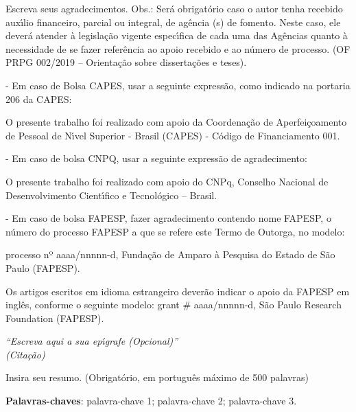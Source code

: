\documentclass[12pt,oneside,a4paper,english]{abntex2}
\begin{document}
\begin{agradecimentos}
    Escreva seus agradecimentos.
    Obs.: Ser\'{a} obrigat\'{o}rio caso o autor tenha recebido aux\'{\i}lio financeiro, parcial ou integral, de ag\^{e}ncia (s) de fomento. Neste caso, ele dever\'{a} atender \`{a} legisla\c{c}\~{a}o vigente espec\'{\i}fica de cada uma das Ag\^{e}ncias quanto \`{a} necessidade de se fazer refer\^{e}ncia ao apoio recebido e ao n\'{u}mero de processo. (OF PRPG 002/2019 – Orienta\c{c}\~{a}o sobre disserta\c{c}\~{o}es e teses).

    -	Em caso de Bolsa CAPES, usar a seguinte express\~{a}o, como indicado na portaria 206 da CAPES:

    O presente trabalho foi realizado com apoio da Coordena\c{c}\~{a}o de Aperfei\c{c}oamento de Pessoal de N\'{\i}vel Superior - Brasil (CAPES) - C\'{o}digo de Financiamento 001.

    -	Em caso de bolsa CNPQ, usar a seguinte express\~{a}o de agradecimento:

    O presente trabalho foi realizado com apoio do CNPq, Conselho Nacional de Desenvolvimento Cient\'{\i}fico  e Tecnol\'{o}gico – Brasil.

    -	Em caso de bolsa FAPESP, fazer agradecimento contendo nome FAPESP, o n\'{u}mero do processo FAPESP a que se refere este Termo de Outorga, no modelo:

    processo nº aaaa/nnnnn-d, Funda\c{c}\~{a}o de Amparo \`{a} Pesquisa do Estado de S\~{a}o Paulo (FAPESP).

    Os artigos escritos em idioma estrangeiro dever\~{a}o indicar o apoio da FAPESP em ingl\^{e}s, conforme o seguinte modelo: grant \# aaaa/nnnnn-d, S\~{a}o Paulo Research Foundation (FAPESP).
\end{agradecimentos}


\begin{epigrafe}
    \vspace*{\fill}
    \begin{flushright}
        \textit{``Escreva aqui a sua ep\'{\i}grafe (Opcional)''\\
        (Cita\c{c}\~{a}o)}
    \end{flushright}
\end{epigrafe}


\setlength{\absparsep}{18pt}
\begin{resumo}
 Insira seu resumo. (Obrigat\'{o}rio, em portugu\^{e}s m\'{a}ximo de 500 palavras)

    \lipsum[1]

    \vspace{\onelineskip}

    \noindent\textbf{Palavras-chaves}: palavra-chave 1; palavra-chave 2; palavra-chave 3.
\end{resumo}
\end{document}
